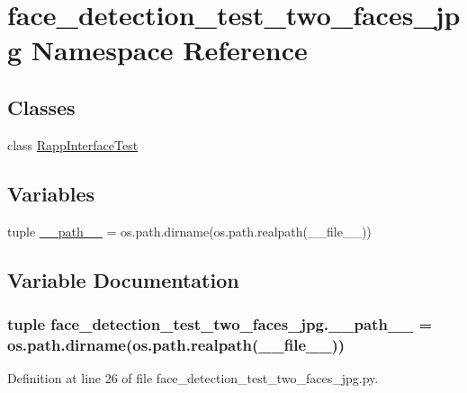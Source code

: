 \hypertarget{namespaceface__detection__test__two__faces__jpg}{\section{face\-\_\-detection\-\_\-test\-\_\-two\-\_\-faces\-\_\-jpg Namespace Reference}
\label{namespaceface__detection__test__two__faces__jpg}
}
\subsection*{Classes}
\begin{DoxyCompactItemize}
\item 
class \hyperlink{classface__detection__test__two__faces__jpg_1_1RappInterfaceTest}{Rapp\-Interface\-Test}
\end{DoxyCompactItemize}
\subsection*{Variables}
\begin{DoxyCompactItemize}
\item 
tuple \hyperlink{namespaceface__detection__test__two__faces__jpg_acd5d64b207795771ce185f5e80142ca6}{\-\_\-\-\_\-path\-\_\-\-\_\-} = os.\-path.\-dirname(os.\-path.\-realpath(\-\_\-\-\_\-file\-\_\-\-\_\-))
\end{DoxyCompactItemize}


\subsection{Variable Documentation}
\hypertarget{namespaceface__detection__test__two__faces__jpg_acd5d64b207795771ce185f5e80142ca6}{
\subsubsection[{\-\_\-\-\_\-path\-\_\-\-\_\-}]{\setlength{\rightskip}{0pt plus 5cm}tuple face\-\_\-detection\-\_\-test\-\_\-two\-\_\-faces\-\_\-jpg.\-\_\-\-\_\-path\-\_\-\-\_\- = os.\-path.\-dirname(os.\-path.\-realpath(\-\_\-\-\_\-file\-\_\-\-\_\-))}}\label{namespaceface__detection__test__two__faces__jpg_acd5d64b207795771ce185f5e80142ca6}


Definition at line 26 of file face\-\_\-detection\-\_\-test\-\_\-two\-\_\-faces\-\_\-jpg.\-py.

